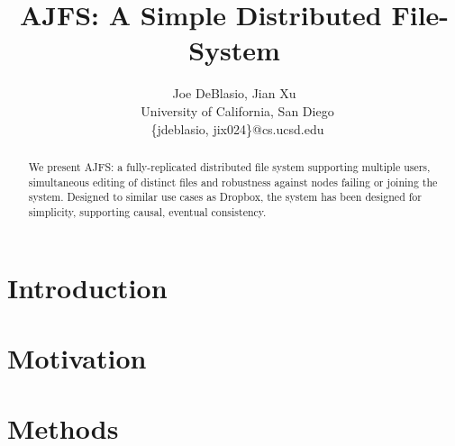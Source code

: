 \documentclass[preprint]{sig-alternate-10pt}
\begin{document}



\title{AJFS: A Simple Distributed File-System}

\author{Joe DeBlasio, Jian Xu\\\
       University of California, San Diego \\\
       \{jdeblasio, jix024\}@cs.ucsd.edu}

\maketitle

\begin{abstract}
    We present AJFS: a fully-replicated distributed file system supporting
    multiple users, simultaneous editing of distinct files and robustness
    against nodes failing or joining the system. Designed to similar use cases
    as Dropbox, the system has been designed for simplicity, supporting causal,
    eventual consistency.
\end{abstract}

\section{Introduction}
    

\section{Motivation}
    

\section{Methods}
    
\end{document}
